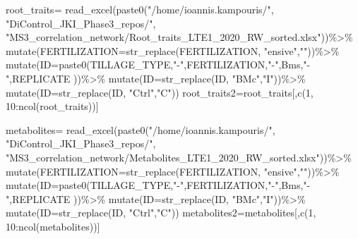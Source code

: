 \documentclass[
]{article}
\newenvironment{Shaded}{\begin{snugshade}}{\end{snugshade}}
\newcommand{\AttributeTok}[1]{\textcolor[rgb]{0.77,0.63,0.00}{#1}}
\newcommand{\DecValTok}[1]{\textcolor[rgb]{0.00,0.00,0.81}{#1}}
\newcommand{\FunctionTok}[1]{\textcolor[rgb]{0.00,0.00,0.00}{#1}}
\newcommand{\NormalTok}[1]{#1}
\newcommand{\OtherTok}[1]{\textcolor[rgb]{0.56,0.35,0.01}{#1}}
\newcommand{\SpecialCharTok}[1]{\textcolor[rgb]{0.00,0.00,0.00}{#1}}
\newcommand{\StringTok}[1]{\textcolor[rgb]{0.31,0.60,0.02}{#1}}
\begin{document}
\begin{Shaded}
\begin{Highlighting}[]
\NormalTok{root\_traits}\OtherTok{=} \FunctionTok{read\_excel}\NormalTok{(}\FunctionTok{paste0}\NormalTok{(}\StringTok{"/home/ioannis.kampouris/"}\NormalTok{,}
\StringTok{"DiControl\_JKI\_Phase3\_repos/"}\NormalTok{,}
\StringTok{"MS3\_correlation\_network/Root\_traits\_LTE1\_2020\_RW\_sorted.xlsx"}\NormalTok{))}\SpecialCharTok{\%\textgreater{}\%}
  \FunctionTok{mutate}\NormalTok{(}\AttributeTok{FERTILIZATION=}\FunctionTok{str\_replace}\NormalTok{(FERTILIZATION, }\StringTok{"ensive"}\NormalTok{,}\StringTok{""}\NormalTok{))}\SpecialCharTok{\%\textgreater{}\%}
  \FunctionTok{mutate}\NormalTok{(}\AttributeTok{ID=}\FunctionTok{paste0}\NormalTok{(TILLAGE\_TYPE,}\StringTok{"{-}"}\NormalTok{,FERTILIZATION,}\StringTok{"{-}"}\NormalTok{,Bms,}\StringTok{"{-}"}\NormalTok{,REPLICATE ))}\SpecialCharTok{\%\textgreater{}\%}
  \FunctionTok{mutate}\NormalTok{(}\AttributeTok{ID=}\FunctionTok{str\_replace}\NormalTok{(ID, }\StringTok{"BMc"}\NormalTok{,}\StringTok{"I"}\NormalTok{))}\SpecialCharTok{\%\textgreater{}\%}
  \FunctionTok{mutate}\NormalTok{(}\AttributeTok{ID=}\FunctionTok{str\_replace}\NormalTok{(ID, }\StringTok{"Ctrl"}\NormalTok{,}\StringTok{"C"}\NormalTok{))}
\NormalTok{root\_traits2}\OtherTok{=}\NormalTok{root\_traits[,}\FunctionTok{c}\NormalTok{(}\DecValTok{1}\NormalTok{, }\DecValTok{10}\SpecialCharTok{:}\FunctionTok{ncol}\NormalTok{(root\_traits))]}

\NormalTok{metabolites}\OtherTok{=} \FunctionTok{read\_excel}\NormalTok{(}\FunctionTok{paste0}\NormalTok{(}\StringTok{"/home/ioannis.kampouris/"}\NormalTok{,}
\StringTok{"DiControl\_JKI\_Phase3\_repos/"}\NormalTok{,}
\StringTok{"MS3\_correlation\_network/Metabolites\_LTE1\_2020\_RW\_sorted.xlsx"}\NormalTok{))}\SpecialCharTok{\%\textgreater{}\%}
  \FunctionTok{mutate}\NormalTok{(}\AttributeTok{FERTILIZATION=}\FunctionTok{str\_replace}\NormalTok{(FERTILIZATION, }\StringTok{"ensive"}\NormalTok{,}\StringTok{""}\NormalTok{))}\SpecialCharTok{\%\textgreater{}\%}
  \FunctionTok{mutate}\NormalTok{(}\AttributeTok{ID=}\FunctionTok{paste0}\NormalTok{(TILLAGE\_TYPE,}\StringTok{"{-}"}\NormalTok{,FERTILIZATION,}\StringTok{"{-}"}\NormalTok{,Bms,}\StringTok{"{-}"}\NormalTok{,REPLICATE ))}\SpecialCharTok{\%\textgreater{}\%}
  \FunctionTok{mutate}\NormalTok{(}\AttributeTok{ID=}\FunctionTok{str\_replace}\NormalTok{(ID, }\StringTok{"BMc"}\NormalTok{,}\StringTok{"I"}\NormalTok{))}\SpecialCharTok{\%\textgreater{}\%}
  \FunctionTok{mutate}\NormalTok{(}\AttributeTok{ID=}\FunctionTok{str\_replace}\NormalTok{(ID, }\StringTok{"Ctrl"}\NormalTok{,}\StringTok{"C"}\NormalTok{))}
\NormalTok{metabolites2}\OtherTok{=}\NormalTok{metabolites[,}\FunctionTok{c}\NormalTok{(}\DecValTok{1}\NormalTok{, }\DecValTok{10}\SpecialCharTok{:}\FunctionTok{ncol}\NormalTok{(metabolites))]}
\end{Highlighting}
\end{Shaded}
\end{document}
